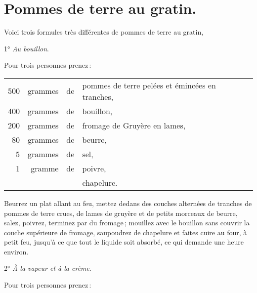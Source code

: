 \section*{\centering Pommes de terre au gratin.}
{}

Voici trois formules très différentes de pommes de terre au gratin,

\medskip

1° \textit{Au bouillon}.

\medskip

Pour trois personnes prenez :

\footnotesize
\begin{longtable}{rrrp{18em}}
    500 & grammes & de & pommes de terre pelées et émincées en tranches,                                  \\
    400 & grammes & de & bouillon,                                                                        \\
    200 & grammes & de & fromage de Gruyère en lames,                                                     \\
     80 & grammes & de & beurre,                                                                          \\
      5 & grammes & de & sel,                                                                             \\
      1 & gramme  & de & poivre,                                                                          \\
        &         &    & chapelure.                                                                       \\
\end{longtable}
\normalsize

Beurrez un plat allant au feu, mettez dedans des couches alternées de tranches
de pommes de terre crues, de lames de gruyère et de petits morceaux de beurre,
salez, poivrez, terminez par du fromage ; mouillez avec le bouillon sans
couvrir la couche supérieure de fromage, saupoudrez de chapelure et faites
cuire au four, à petit feu, jusqu'à ce que tout le liquide soit absorbé, ce qui
demande une heure environ.

\medskip

2° \textit{À la vapeur et à la crème}.

\medskip

Pour trois personnes prenez :

